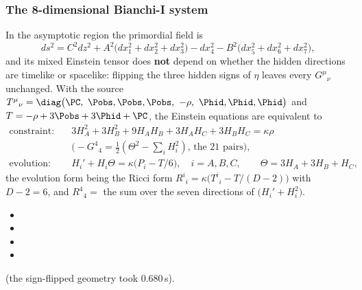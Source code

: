 \subsubsection{The 8-dimensional Bianchi-I system}
\label{sec:4.3.4}

In the asymptotic region the primordial field is
\[
  ds^2=C^2dz^2+A^2\bigl(dx_1^2+dx_2^2+dx_3^2\bigr)-dx_4^2-B^2\bigl(dx_5^2+dx_6^2+dx_7^2\bigr),
\]
and its mixed Einstein tensor does \textbf{not} depend on whether the hidden directions are timelike or
spacelike: flipping the three hidden signs of $\eta$ leaves every $G^\mu{}_\nu$ unchanged. With the
source $T^\mu{}_\nu=\diag\bigl(\PC,\ \Pobs,\Pobs,\Pobs,\ -\rho,\ \Phid,\Phid,\Phid\bigr)$ and
$T=-\rho+3\Pobs+3\Phid+\PC$, the Einstein equations are equivalent to
\begin{align*}
  \text{constraint:}&\quad 3H_A^2+3H_B^2+9H_AH_B+3H_AH_C+3H_BH_C=\kappa\rho\\
  &\quad\bigl(-G^4{}_4=\tfrac12(\Theta^2-\textstyle\sum_iH_i^2)\text{, the 21 pairs}\bigr),\\
  \text{evolution:}&\quad H_i'+H_i\Theta=\kappa\bigl(P_i-T/6\bigr),\quad i=A,B,C,\qquad \Theta=3H_A+3H_B+H_C,
\end{align*}
the evolution form being the Ricci form $R^i{}_i=\kappa\bigl(T^i{}_i-T/(D-2)\bigr)$ with $D-2=6$, and
$R^4{}_4=$ the sum over the seven directions of $\bigl(H_i'+H_i^2\bigr)$. 
\begin{itemize}
  \item {}
  \item {}
  \item {}
  \item {}
\end{itemize}
(the sign-flipped geometry took 0.680\,s).

